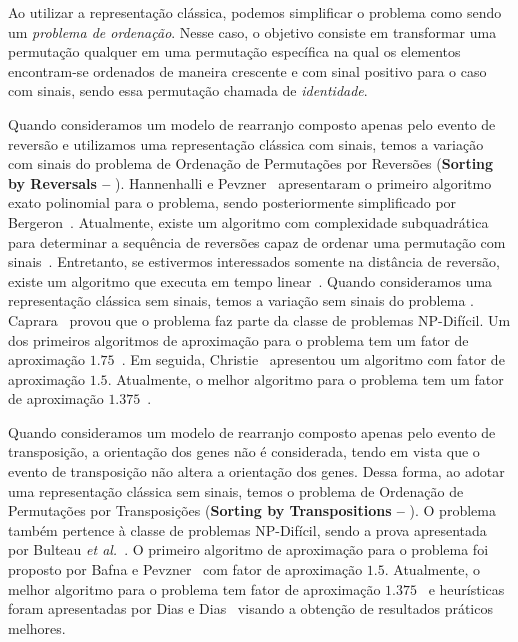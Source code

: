 Ao utilizar a representação clássica, podemos simplificar o problema como sendo um \emph{problema de ordenação}. Nesse caso, o objetivo consiste em transformar uma permutação qualquer em uma permutação específica na qual os elementos encontram-se ordenados de maneira crescente e com sinal positivo para o caso com sinais, sendo essa permutação chamada de \emph{identidade}.

Quando consideramos um modelo de rearranjo composto apenas pelo evento de reversão e utilizamos uma representação clássica com sinais, temos a variação com sinais do problema de Ordenação de Permutações por Reversões (\textbf{Sorting by Reversals --} \SbR). Hannenhalli e Pevzner~\cite{1999-hannenhalli-pevzner} apresentaram o primeiro algoritmo exato polinomial para o problema, sendo posteriormente simplificado por Bergeron~\cite{2005-bergeron}. Atualmente, existe um algoritmo com complexidade subquadrática para determinar a sequência de reversões capaz de ordenar uma permutação com sinais~\cite{2007-tannier-etal}. Entretanto, se estivermos interessados somente na distância de reversão, existe um algoritmo que executa em tempo linear~\cite{2001-bader-etal}. Quando consideramos uma representação clássica sem sinais, temos a variação sem sinais do problema \SbR. Caprara~\cite{1999a-caprara} provou que o problema faz parte da classe de problemas NP-Difícil. Um dos primeiros algoritmos de aproximação para o problema tem um fator de aproximação $1.75$~\cite{1996-bafna-pevzner}. Em seguida, Christie~\cite{1998a-christie} apresentou um algoritmo com fator de aproximação $1.5$. Atualmente, o melhor algoritmo para o problema tem um fator de aproximação $1.375$~\cite{2002-berman-etal}.

Quando consideramos um modelo de rearranjo composto apenas pelo evento de transposição, a orientação dos genes não é considerada, tendo em vista que o evento de transposição não altera a orientação dos genes. Dessa forma, ao adotar uma representação clássica sem sinais, temos o problema de Ordenação de Permutações por Transposições (\textbf{Sorting by Transpositions --} \SbT). O problema também pertence à classe de problemas NP-Difícil, sendo a prova apresentada por Bulteau \textit{et al.}~\cite{2012-bulteau-etal}. O primeiro algoritmo de aproximação para o problema foi proposto por Bafna e Pevzner~\cite{1998-bafna-pevzner} com fator de aproximação $1.5$. Atualmente, o melhor algoritmo para o problema tem fator de aproximação $1.375$~\cite{2006-elias-hartman,2022-silva-etal} e heurísticas foram apresentadas por Dias e Dias~\cite{2010c-dias-dias} visando a obtenção de resultados práticos melhores. 

